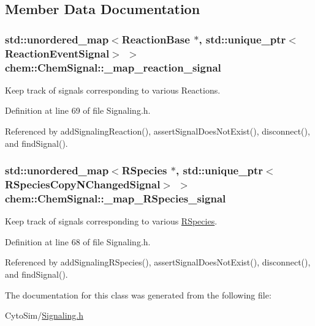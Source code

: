 \subsection{Member Data Documentation}
\hypertarget{classchem_1_1ChemSignal_a5a8fb8af001c1575256ee7b671c42ea3}{
\subsubsection[{\-\_\-map\-\_\-reaction\-\_\-signal}]{\setlength{\rightskip}{0pt plus 5cm}std\-::unordered\-\_\-map$<${\bf Reaction\-Base} $\ast$, std\-::unique\-\_\-ptr$<${\bf Reaction\-Event\-Signal}$>$ $>$ {\bf chem\-::\-Chem\-Signal\-::\-\_\-map\-\_\-reaction\-\_\-signal}}}\label{classchem_1_1ChemSignal_a5a8fb8af001c1575256ee7b671c42ea3}


Keep track of signals corresponding to various Reactions. 



Definition at line 69 of file Signaling.\-h.



Referenced by add\-Signaling\-Reaction(), assert\-Signal\-Does\-Not\-Exist(), disconnect(), and find\-Signal().

\hypertarget{classchem_1_1ChemSignal_a7721fb9395d65c7de08108163a3d4cdb}{
\subsubsection[{\-\_\-map\-\_\-\-R\-Species\-\_\-signal}]{\setlength{\rightskip}{0pt plus 5cm}std\-::unordered\-\_\-map$<${\bf R\-Species} $\ast$, std\-::unique\-\_\-ptr$<${\bf R\-Species\-Copy\-N\-Changed\-Signal}$>$ $>$ {\bf chem\-::\-Chem\-Signal\-::\-\_\-map\-\_\-\-R\-Species\-\_\-signal}}}\label{classchem_1_1ChemSignal_a7721fb9395d65c7de08108163a3d4cdb}


Keep track of signals corresponding to various \hyperlink{classchem_1_1RSpecies}{R\-Species}. 



Definition at line 68 of file Signaling.\-h.



Referenced by add\-Signaling\-R\-Species(), assert\-Signal\-Does\-Not\-Exist(), disconnect(), and find\-Signal().



The documentation for this class was generated from the following file\-:\begin{DoxyCompactItemize}
\item 
Cyto\-Sim/\hyperlink{Signaling_8h}{Signaling.\-h}\end{DoxyCompactItemize}
